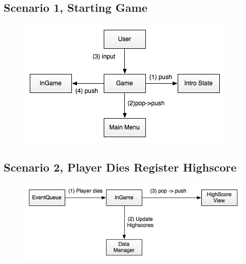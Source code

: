 \subsection{Scenario 1, Starting Game}

\begin{figure}[H]
	\begin{center}
		\includegraphics[scale=0.75]{graphics/scenario_1_StartingGame}
	\end{center}
\end{figure}

\subsection{Scenario 2, Player Dies Register Highscore}

\begin{figure}[H]
	\begin{center}
		\includegraphics[scale=0.75]{graphics/scenario_2_PlayerDiesHighScore}
	\end{center}
\end{figure}